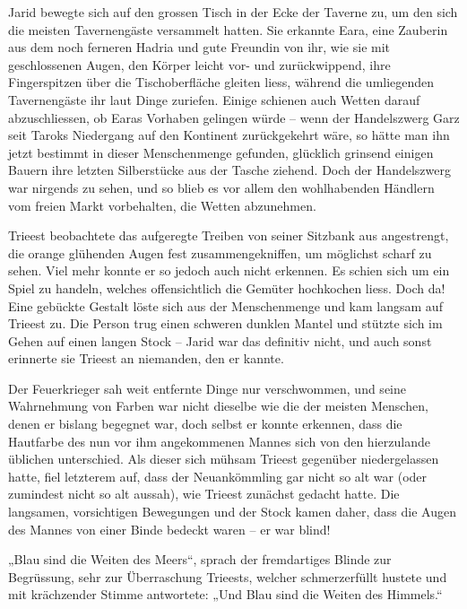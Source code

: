 \trennzeichen



Jarid bewegte sich auf den grossen Tisch in der Ecke der Taverne zu, um den sich die meisten Tavernengäste versammelt hatten. Sie erkannte Eara, eine Zauberin aus dem noch ferneren Hadria und gute Freundin von ihr, wie sie mit geschlossenen Augen, den Körper leicht vor- und zurückwippend, ihre Fingerspitzen über die Tischoberfläche gleiten liess, während die umliegenden Tavernengäste ihr laut Dinge zuriefen. Einige schienen auch Wetten darauf abzuschliessen, ob Earas Vorhaben gelingen würde – wenn der Handelszwerg Garz seit Taroks Niedergang auf den Kontinent zurückgekehrt wäre, so hätte man ihn jetzt bestimmt in dieser Menschenmenge gefunden, glücklich grinsend einigen Bauern ihre letzten Silberstücke aus der Tasche ziehend. Doch der Handelszwerg war nirgends zu sehen, und so blieb es vor allem den wohlhabenden Händlern vom freien Markt vorbehalten, die Wetten abzunehmen.



\trennzeichen



Trieest beobachtete das aufgeregte Treiben von seiner Sitzbank aus angestrengt, die orange glühenden Augen fest zusammengekniffen, um möglichst scharf zu sehen. Viel mehr konnte er so jedoch auch nicht erkennen. Es schien sich um ein Spiel zu handeln, welches offensichtlich die Gemüter hochkochen liess. Doch da! Eine gebückte Gestalt löste sich aus der Menschenmenge und kam langsam auf Trieest zu. Die Person trug einen schweren dunklen Mantel und stützte sich im Gehen auf einen langen Stock – Jarid war das definitiv nicht, und auch sonst erinnerte sie Trieest an niemanden, den er kannte.

Der Feuerkrieger sah weit entfernte Dinge nur verschwommen, und seine Wahrnehmung von Farben war nicht dieselbe wie die der meisten Menschen, denen er bislang begegnet war, doch selbst er konnte erkennen, dass die Hautfarbe des nun vor ihm angekommenen Mannes sich von den hierzulande üblichen unterschied. Als dieser sich mühsam Trieest gegenüber niedergelassen hatte, fiel letzterem auf, dass der Neuankömmling gar nicht so alt war (oder zumindest nicht so alt aussah), wie Trieest zunächst gedacht hatte. Die langsamen, vorsichtigen Bewegungen und der Stock kamen daher, dass die Augen des Mannes von einer Binde bedeckt waren – er war blind!

„Blau sind die Weiten des Meers“, sprach der fremdartiges Blinde zur Begrüssung, sehr zur Überraschung Trieests, welcher schmerzerfüllt hustete und mit krächzender Stimme antwortete: „Und Blau sind die Weiten des Himmels.“


